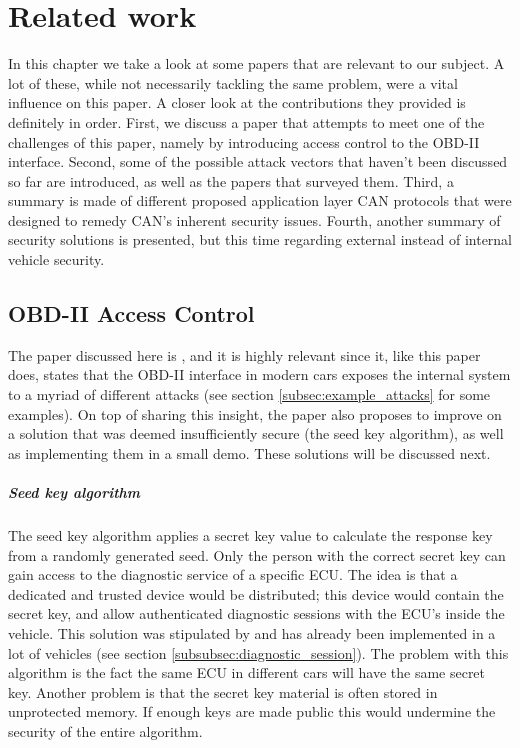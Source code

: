 \chapter{Related work}
\label{chap:related_work}

In this chapter we take a look at some papers that are relevant to our subject. A lot of these, while not necessarily tackling the same problem, were a vital influence on this paper. A closer look at the contributions they provided is definitely in order. First, we discuss a paper that attempts to meet one of the challenges of this paper, namely by introducing access control to the OBD-II interface. Second, some of the possible attack vectors that haven't been discussed so far are introduced, as well as the papers that surveyed them. Third, a summary is made of different proposed application layer CAN protocols that were designed to remedy CAN's inherent security issues. Fourth, another summary of security solutions is presented, but this time regarding external instead of internal vehicle security. 

\section{OBD-II Access Control}
\label{sec:obd_access_control}

The paper discussed here is \cite{Yadav16}, and it is highly relevant since it, like this paper does, states that the OBD-II interface in modern cars exposes the internal system to a myriad of different attacks (see section \ref{subsec:example_attacks} for some examples). On top of sharing this insight, the paper also proposes to improve on a solution that was deemed insufficiently secure (the seed key algorithm), as well as implementing them in a small demo. These solutions will be discussed next.


\paragraph{Seed key algorithm} The seed key algorithm applies a secret key value to calculate the response key from a randomly generated seed. Only the person with the correct secret key can gain access to the diagnostic service of a specific ECU. The idea is that a dedicated and trusted device would be distributed; this device would contain the secret key, and allow authenticated diagnostic sessions with the ECU's inside the vehicle. This solution was stipulated by \cite{Bayer} and has already been implemented in a lot of vehicles (see section \ref{subsubsec:diagnostic_session}). The problem with this algorithm is the fact the same ECU in different cars will have the same secret key. Another problem is that the secret key material is often stored in unprotected memory. If enough keys are made public this would undermine the security of the entire algorithm.  

